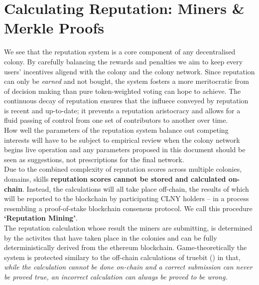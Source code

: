
\section{Calculating Reputation: Miners \& Merkle Proofs}\label{sec:reputationmining}
We see that the reputation system is a core component of any decentralised colony. By carefully balancing the rewards and penalties we aim to keep every users' incentives aligend with the colony and the colony network. Since reputation can only be \emph{earned} and not bought, the system fosters a more meritocratic from of decision making than pure token-weighted voting can hope to achieve. The continuous decay of reputation ensures that the influece conveyed by reputation is recent and up-to-date; it prevents a reputation aristocracy and allows for a fluid passing of control from one set of contributors to another over time.\\
How well the parameters of the reputation system balance out competing interests will have to be subject to empirical review when the colony network begins live operation and any parameters proposed in this document should be seen as suggestions, not prescriptions for the final network.\\
Due to the combined complexity of reputation scores across multiple colonies, domains, skills%
\textbf{reputation scores cannot be stored and calculated on-chain}. Instead, the calculations will all take place off-chain, the results of which will be reported to the blockchain by participating CLNY holders -- in a process resembling a proof-of-stake blockchain consensus protocol. We call this procedure \textbf{`Reputation Mining'}.\\
The reputation calculation whose result the miners are submitting, is determined by the activites that have taken place in the colonies and can be fully deterministically derived from the ethereum blockchain. Game-theoretically the system is protected similary to the off-chain calculations of truebit (\cite{TruebitWhitepaper}) in that, \emph{while the calculation cannot be done on-chain and a correct submission can never be proved true, an incorrect calculation can always be proved to be wrong.}


